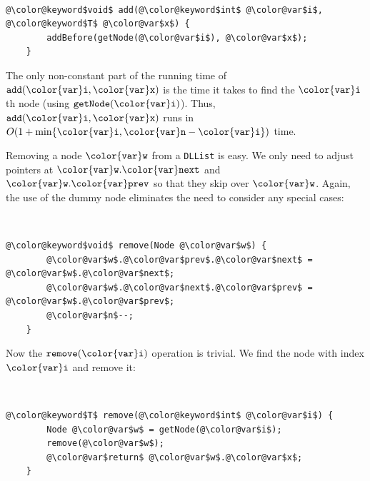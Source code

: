 \documentclass[10pt]{book}
\theoremstyle{plain}
\theoremstyle{definition}
\begin{document}
 \ \vspace{.5ex}\begin{Verbatim}[gobble=1,tabsize=2,frame=single,framerule=1.2pt,commandchars=\\@\$,label=\texttt{DLList},labelposition=topline]
	@\color@keyword$void$ add(@\color@keyword$int$ @\color@var$i$, @\color@keyword$T$ @\color@var$x$) {
		addBefore(getNode(@\color@var$i$), @\color@var$x$);
	}
\end{Verbatim}


The only non-constant part of the running time of \ensuremath{\mathtt{add({\color{var}i},{\color{var}x})}} is the time
it takes to find the \ensuremath{\mathtt{{\color{var}i}}}th node (using \ensuremath{\mathtt{getNode({\color{var}i})}}).  Thus, \ensuremath{\mathtt{add({\color{var}i},{\color{var}x})}}
runs in $O(1+\min\{\ensuremath{\mathtt{{\color{var}i}}}, \ensuremath{\mathtt{{\color{var}n}}}-\ensuremath{\mathtt{{\color{var}i}}}\})$ time.

Removing a node \ensuremath{\mathtt{{\color{var}w}}} from a \texttt{DLList} is easy.  We only need to adjust
pointers at \ensuremath{\mathtt{{\color{var}w}.{\color{var}next}}} and \ensuremath{\mathtt{{\color{var}w}.{\color{var}prev}}} so that they skip over \ensuremath{\mathtt{{\color{var}w}}}.  Again, the
use of the dummy node eliminates the need to consider any special cases:



 \ \vspace{.5ex}\begin{Verbatim}[gobble=1,tabsize=2,frame=single,framerule=1.2pt,commandchars=\\@\$,label=\texttt{DLList},labelposition=topline]
	@\color@keyword$void$ remove(Node @\color@var$w$) {
		@\color@var$w$.@\color@var$prev$.@\color@var$next$ = @\color@var$w$.@\color@var$next$;
		@\color@var$w$.@\color@var$next$.@\color@var$prev$ = @\color@var$w$.@\color@var$prev$;
		@\color@var$n$--;
	}
\end{Verbatim}


Now the \ensuremath{\mathtt{remove({\color{var}i})}} operation is trivial. We find the node with index \ensuremath{\mathtt{{\color{var}i}}} and remove it:



 \ \vspace{.5ex}\begin{Verbatim}[gobble=1,tabsize=2,frame=single,framerule=1.2pt,commandchars=\\@\$,label=\texttt{DLList},labelposition=topline]
	@\color@keyword$T$ remove(@\color@keyword$int$ @\color@var$i$) {
		Node @\color@var$w$ = getNode(@\color@var$i$);
		remove(@\color@var$w$);
		@\color@var$return$ @\color@var$w$.@\color@var$x$;
	}
\end{Verbatim}
\end{document}
